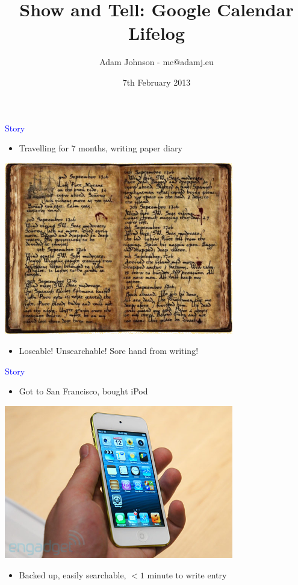 \documentclass[landscape]{slides}
\title{Show and Tell: Google Calendar Lifelog}
\author{Adam Johnson - me@adamj.eu}
\date{7th February 2013}
\begin{document}
\maketitle

\begin{slide}

    \textcolor{blue}{\Large{Story}}

    \begin{itemize}
        \item Travelling for 7 months, writing paper diary
    \end{itemize}

    \includegraphics[width=10cm]{capitans-log}

    \begin{itemize}
        \item Loseable! Unsearchable! Sore hand from writing!
    \end{itemize}

\end{slide}


\begin{slide}

    \textcolor{blue}{\Large{Story}}

    \begin{itemize}
        \item Got to San Francisco, bought iPod
    \end{itemize}

    \includegraphics[width=10cm]{new-ipod-touch-2012}

    \begin{itemize}
        \item Backed up, easily searchable, $<1$ minute to write entry
    \end{itemize}

\end{slide}
\end{document}
